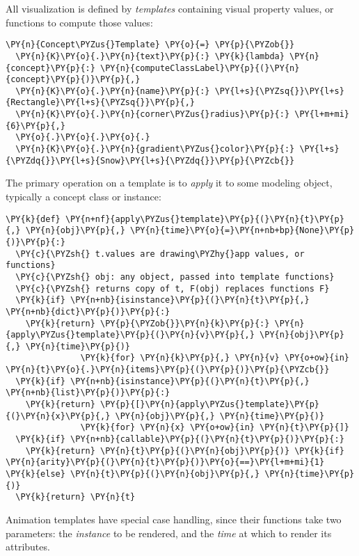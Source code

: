 \documentclass[letterpaper,compsoc,twoside]{IEEEtran}
\makeatletter
\def\PY@reset{\let\PY@it=\relax \let\PY@bf=\relax \let\PY@ul=\relax \let\PY@tc=\relax \let\PY@bc=\relax \let\PY@ff=\relax}
\def\PY@tok#1{\csname PY@tok@#1\endcsname}
\def\PY@toks#1+{\ifx\relax#1\empty\else \PY@tok{#1}\expandafter\PY@toks\fi}
\def\PY@do#1{\PY@bc{\PY@tc{\PY@ul{\PY@it{\PY@bf{\PY@ff{#1}}}}}}}
\def\PY#1#2{\PY@reset\PY@toks#1+\relax+\PY@do{#2}}
\def\PYZus{\char`\_}
\def\PYZob{\char`\{}
\def\PYZcb{\char`\}}
\def\PYZsh{\char`\#}
\def\PYZhy{\char`\-}
\def\PYZsq{\char`\'}
\def\PYZdq{\char`\"}
\makeatother
\begin{document}
All visualization is defined by \emph{templates} containing visual property values, or functions to compute those values:\begin{Verbatim}[commandchars=\\\{\},fontsize=\footnotesize]
\PY{n}{Concept\PYZus{}Template} \PY{o}{=} \PY{p}{\PYZob{}}
  \PY{n}{K}\PY{o}{.}\PY{n}{text}\PY{p}{:} \PY{k}{lambda} \PY{n}{concept}\PY{p}{:} \PY{n}{computeClassLabel}\PY{p}{(}\PY{n}{concept}\PY{p}{)}\PY{p}{,}
  \PY{n}{K}\PY{o}{.}\PY{n}{name}\PY{p}{:} \PY{l+s}{\PYZsq{}}\PY{l+s}{Rectangle}\PY{l+s}{\PYZsq{}}\PY{p}{,}
  \PY{n}{K}\PY{o}{.}\PY{n}{corner\PYZus{}radius}\PY{p}{:} \PY{l+m+mi}{6}\PY{p}{,}
  \PY{o}{.}\PY{o}{.}\PY{o}{.}
  \PY{n}{K}\PY{o}{.}\PY{n}{gradient\PYZus{}color}\PY{p}{:} \PY{l+s}{\PYZdq{}}\PY{l+s}{Snow}\PY{l+s}{\PYZdq{}}\PY{p}{\PYZcb{}}
\end{Verbatim}
The primary operation on a template is to \emph{apply} it to some modeling object, typically a concept class or instance:\begin{Verbatim}[commandchars=\\\{\},fontsize=\footnotesize]
\PY{k}{def} \PY{n+nf}{apply\PYZus{}template}\PY{p}{(}\PY{n}{t}\PY{p}{,} \PY{n}{obj}\PY{p}{,} \PY{n}{time}\PY{o}{=}\PY{n+nb+bp}{None}\PY{p}{)}\PY{p}{:}
  \PY{c}{\PYZsh{} t.values are drawing\PYZhy{}app values, or functions}
  \PY{c}{\PYZsh{} obj: any object, passed into template functions}
  \PY{c}{\PYZsh{} returns copy of t, F(obj) replaces functions F}
  \PY{k}{if} \PY{n+nb}{isinstance}\PY{p}{(}\PY{n}{t}\PY{p}{,} \PY{n+nb}{dict}\PY{p}{)}\PY{p}{:}
    \PY{k}{return} \PY{p}{\PYZob{}}\PY{n}{k}\PY{p}{:} \PY{n}{apply\PYZus{}template}\PY{p}{(}\PY{n}{v}\PY{p}{,} \PY{n}{obj}\PY{p}{,} \PY{n}{time}\PY{p}{)}
               \PY{k}{for} \PY{n}{k}\PY{p}{,} \PY{n}{v} \PY{o+ow}{in} \PY{n}{t}\PY{o}{.}\PY{n}{items}\PY{p}{(}\PY{p}{)}\PY{p}{\PYZcb{}}
  \PY{k}{if} \PY{n+nb}{isinstance}\PY{p}{(}\PY{n}{t}\PY{p}{,} \PY{n+nb}{list}\PY{p}{)}\PY{p}{:}
    \PY{k}{return} \PY{p}{[}\PY{n}{apply\PYZus{}template}\PY{p}{(}\PY{n}{x}\PY{p}{,} \PY{n}{obj}\PY{p}{,} \PY{n}{time}\PY{p}{)}
               \PY{k}{for} \PY{n}{x} \PY{o+ow}{in} \PY{n}{t}\PY{p}{]}
  \PY{k}{if} \PY{n+nb}{callable}\PY{p}{(}\PY{n}{t}\PY{p}{)}\PY{p}{:}
    \PY{k}{return} \PY{n}{t}\PY{p}{(}\PY{n}{obj}\PY{p}{)} \PY{k}{if} \PY{n}{arity}\PY{p}{(}\PY{n}{t}\PY{p}{)}\PY{o}{==}\PY{l+m+mi}{1} \PY{k}{else} \PY{n}{t}\PY{p}{(}\PY{n}{obj}\PY{p}{,} \PY{n}{time}\PY{p}{)}
  \PY{k}{return} \PY{n}{t}
\end{Verbatim}
Animation templates have special case handling, since their functions take two parameters: the \emph{instance} to be rendered, and the \emph{time} at which to render its attributes.
\end{document}
